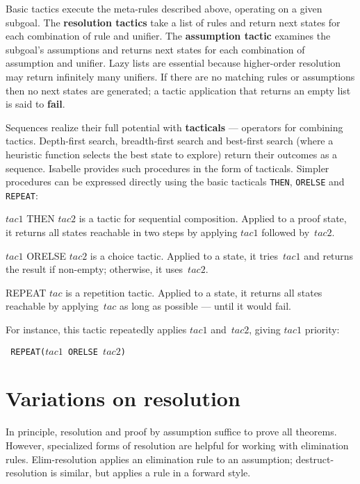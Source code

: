 Basic tactics execute the meta-rules described above, operating on a
given subgoal.  The {\bf resolution tactics} take a list of rules and
return next states for each combination of rule and unifier.  The {\bf
assumption tactic} examines the subgoal's assumptions and returns next
states for each combination of assumption and unifier.  Lazy lists are
essential because higher-order resolution may return infinitely many
unifiers.  If there are no matching rules or assumptions then no next
states are generated; a tactic application that returns an empty list is
said to {\bf fail}.

Sequences realize their full potential with {\bf tacticals} --- operators
for combining tactics.  Depth-first search, breadth-first search and
best-first search (where a heuristic function selects the best state to
explore) return their outcomes as a sequence.  Isabelle provides such
procedures in the form of tacticals.  Simpler procedures can be expressed
directly using the basic tacticals {\tt THEN}, {\tt ORELSE} and {\tt REPEAT}:
\begin{ttdescription}
\item[$tac1$ THEN $tac2$] is a tactic for sequential composition.  Applied
to a proof state, it returns all states reachable in two steps by applying
$tac1$ followed by~$tac2$.

\item[$tac1$ ORELSE $tac2$] is a choice tactic.  Applied to a state, it
tries~$tac1$ and returns the result if non-empty; otherwise, it uses~$tac2$.

\item[REPEAT $tac$] is a repetition tactic.  Applied to a state, it
returns all states reachable by applying~$tac$ as long as possible --- until
it would fail.  
\end{ttdescription}
For instance, this tactic repeatedly applies $tac1$ and~$tac2$, giving
$tac1$ priority:
\begin{center} \tt
REPEAT($tac1$ ORELSE $tac2$)
\end{center}


\section{Variations on resolution}
In principle, resolution and proof by assumption suffice to prove all
theorems.  However, specialized forms of resolution are helpful for working
with elimination rules.  Elim-resolution applies an elimination rule to an
assumption; destruct-resolution is similar, but applies a rule in a forward
style.

